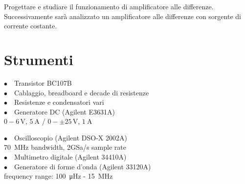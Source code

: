 Progettare e studiare il funzionamento di amplificatore alle differenze. Successivamente sarà analizzato un amplificatore alle differenze con sorgente di corrente costante. 

\section{Strumenti}
%
\noindent
\begin{minipage}{.5\linewidth}
$\bullet \quad$Transistor BC107B\\
$\bullet \quad$Cablaggio, breadboard e decade di resistenze\\
$\bullet \quad$Resistenze e condensatori vari\\
$\bullet \quad$Generatore DC (Agilent E3631A)\\
\phantom{xxxx}$0-6\,\si{\volt}$, $\SI{5}{\ampere}$ / $0-\pm25\,\si{\volt}$, $\SI{1}{\ampere}$\\
\end{minipage}%
\begin{minipage}{.5\linewidth}
$\bullet \quad$Oscilloscopio (Agilent DSO-X 2002A)\\
\phantom{xxxx}\SI{70}{\mega\hertz} bandwidth, 2GSa/s sample rate\\
$\bullet \quad$Multimetro digitale (Agilent 34410A)\\
$\bullet \quad$Generatore di forme d'onda (Agilent 33120A)\\
\phantom{xxxx}frequency range: \SI{100}{\micro\hertz} - \SI{15}{\mega\hertz}\\
\end{minipage}